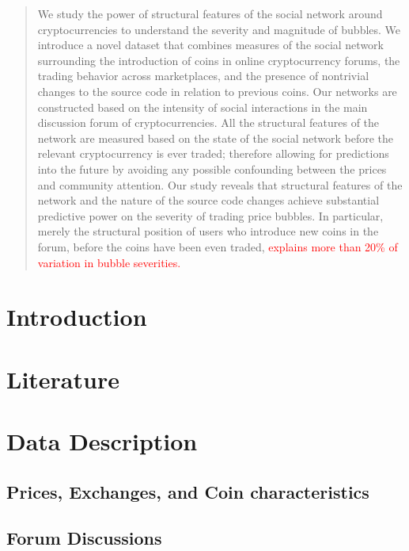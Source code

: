 \documentclass[letterpaper]{article}
\begin{document}
\begin{abstract}

We study the power of structural features of the social network around cryptocurrencies to understand the severity and magnitude of bubbles. 
We introduce a novel dataset that combines measures of the social network surrounding the introduction of coins in online cryptocurrency forums, the trading  behavior across marketplaces, and the presence of nontrivial changes to the source code in relation to previous coins.
Our networks are constructed based on the intensity of social interactions in the main discussion forum of cryptocurrencies. All the structural features of the network are measured based on the state of the social network before the relevant cryptocurrency is ever traded; therefore allowing for predictions into the future by avoiding any possible confounding between the prices and community attention.
Our study reveals that structural features of the network and the nature of the source code changes achieve substantial predictive power on the severity of trading price bubbles. In particular, merely the structural position of users who introduce new coins in the forum, before the coins have been even traded, \textcolor{red}{explains more than 20\% of variation in bubble severities.}

\end{abstract}

\section{Introduction}

\section{Literature}


\section{Data Description}
\subsection{Prices, Exchanges, and Coin characteristics}

%

\subsection{Forum Discussions}

\end{document}
